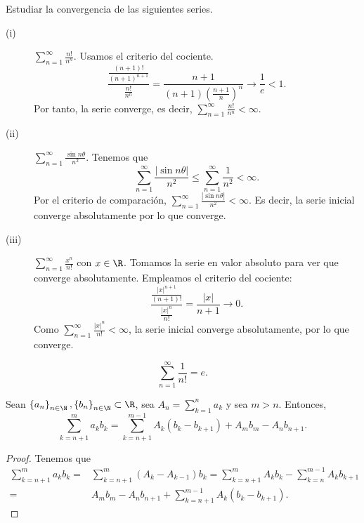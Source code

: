 \begin{eg}
\normalfont Estudiar la convergencia de las siguientes series.
\begin{description}
\item[(i)] $\displaystyle \sum^{\infty}_{n = 1}\frac{n!}{n^{n}} $. Usamos el criterio del cociente.
	\[\frac{\frac{\left(n+1\right)!}{\left(n+1\right)^{n+1}}}{\frac{n!}{n^{n}}} = \frac{n+1}{\left(n+1\right)\left(\frac{n+1}{n}\right)^{n}} \to \frac{1}{e} < 1 .\]
	Por tanto, la serie converge, es decir, $\displaystyle \sum^{\infty}_{n = 1}\frac{n!}{n^{n}} < \infty $.
\item[(ii)] $\displaystyle \sum^{\infty}_{n = 1}\frac{\sin n\theta}{n^{2}} $. Tenemos que 
	\[\sum^{\infty}_{n = 1} \frac{ \left|\sin n\theta\right|}{n^{2}} \leq \sum^{\infty}_{n = 1}\frac{1}{n^{2}} < \infty .\]
	Por el criterio de comparación, $\displaystyle \sum^{\infty}_{n = 1}\frac{ \left|\sin n\theta\right|}{n^{2}} < \infty $. Es decir, la serie inicial converge absolutamente por lo que converge.
\item[(iii)] $\displaystyle \sum^{\infty}_{n = 1}\frac{x^{n}}{n!} $ con $\displaystyle x \in \R $. Tomamos la serie en valor absoluto para ver que converge absolutamente. Empleamos el criterio del cociente: 
	\[ \frac{ \frac{ \left|x\right|^{n+1}}{\left(n+1\right)!}}{\frac{ \left|x\right|^{n}}{n!}}=\frac{ \left|x\right|}{n+1} \to 0.\]
Como $\displaystyle \sum^{\infty}_{n = 1} \frac{ \left|x\right|^{n}}{n!} < \infty $, la serie inicial converge absolutamente, por lo que converge.	
\end{description}
\end{eg}

\begin{observation}
\normalfont  
\[\sum^{\infty}_{ n=1}\frac{1}{n!} = e .\]
\end{observation}

\begin{ftheorem}
	\normalfont Sean $\displaystyle \left\{ a_{n}\right\} _{n\in\N}, \left\{ b_{n}\right\} _{n\in\N}\subset\R $, sea $\displaystyle A_{n} = \sum^{n}_{k=1}a_{k} $ y sea $\displaystyle m > n $. Entonces, 
	\[\sum^{m}_{k=n+1}a_{k}b_{k} = \sum^{m -1}_{k=n+1}A_{k}\left(b_{k}-b_{k+1}\right) + A_{m}b_{m}-A_{n}b_{n+1} .\]
\end{ftheorem}

\begin{proof}
Tenemos que 
\[
\begin{split}
	\sum^{m}_{k=n+1}a_{k}b_{k} = & \sum^{m}_{k=n+1}\left(A_{k}-A_{k-1}\right)b_{k} = \sum^{m}_{k=n+1}A_{k}b_{k} - \sum^{m - 1}_{k=n}A_{k}b_{k+1}\\ = &A_{m}b_{m} - A_{n}b_{n+1} + \sum^{m - 1}_{k = n + 1}A_{k}\left(b_{k}-b_{k+1}\right).
\end{split}
\]
\end{proof}

